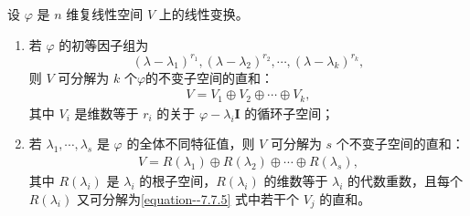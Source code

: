 \documentclass[../../main.tex]{subfiles}%
\begin{document}
\begin{theorem}\label{theorem:Jordan标准型的几何意义}
设 $\varphi$ 是 $n$ 维复线性空间 $V$ 上的线性变换。
\begin{enumerate}[(1)]
\item 若 $\varphi$ 的初等因子组为
\[
(\lambda - \lambda_1)^{r_1}, (\lambda - \lambda_2)^{r_2}, \cdots, (\lambda - \lambda_k)^{r_k},
\]
则 $V$ 可分解为 $k$ 个$\varphi$的不变子空间的直和：
\begin{align}
V = V_1 \oplus V_2 \oplus \cdots \oplus V_k, \label{equation--7.7.5}
\end{align}
其中 $V_i$ 是维数等于 $r_i$ 的关于 $\varphi - \lambda_i\boldsymbol{I}$ 的循环子空间；

\item 若 $\lambda_1, \cdots, \lambda_s$ 是 $\varphi$ 的全体不同特征值，则 $V$ 可分解为 $s$ 个不变子空间的直和：
\begin{align*}
V = R(\lambda_1) \oplus R(\lambda_2) \oplus \cdots \oplus R(\lambda_s), 
\end{align*}
其中 $R(\lambda_i)$ 是 $\lambda_i$ 的根子空间，$R(\lambda_i)$ 的维数等于 $\lambda_i$ 的代数重数，且每个 $R(\lambda_i)$ 又可分解为\eqref{equation--7.7.5} 式中若干个 $V_j$ 的直和。 
\end{enumerate} 
\end{theorem}
\end{document}

